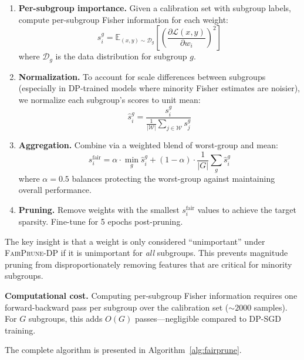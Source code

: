 \documentclass{article}
\newcommand{\FairPrunDP}{\textsc{FairPrune-DP}}
\begin{document}
\begin{enumerate}
    \item \textbf{Per-subgroup importance.} Given a calibration set with subgroup labels, compute per-subgroup Fisher information for each weight:
    \begin{equation}
        s_i^g = \mathbb{E}_{(x,y) \sim \mathcal{D}_g} \left[ \left(\frac{\partial \mathcal{L}(x, y)}{\partial w_i}\right)^2 \right]
        \label{eq:fisher}
    \end{equation}
    where $\mathcal{D}_g$ is the data distribution for subgroup $g$.

    \item \textbf{Normalization.} To account for scale differences between subgroups (especially in DP-trained models where minority Fisher estimates are noisier), we normalize each subgroup's scores to unit mean:
    \begin{equation}
        \hat{s}_i^g = \frac{s_i^g}{\frac{1}{|\mathcal{W}|}\sum_{j \in \mathcal{W}} s_j^g}
    \end{equation}

    \item \textbf{Aggregation.} Combine via a weighted blend of worst-group and mean:
    \begin{equation}
        s_i^{\text{fair}} = \alpha \cdot \min_g \hat{s}_i^g + (1 - \alpha) \cdot \frac{1}{|G|}\sum_g \hat{s}_i^g
        \label{eq:fair_score}
    \end{equation}
    where $\alpha = 0.5$ balances protecting the worst-group against maintaining overall performance.

    \item \textbf{Pruning.} Remove weights with the smallest $s_i^{\text{fair}}$ values to achieve the target sparsity. Fine-tune for 5 epochs post-pruning.
\end{enumerate}

The key insight is that a weight is only considered ``unimportant'' under \FairPrunDP{} if it is unimportant for \emph{all} subgroups. This prevents magnitude pruning from disproportionately removing features that are critical for minority subgroups.

\textbf{Computational cost.} Computing per-subgroup Fisher information requires one forward-backward pass per subgroup over the calibration set (${\sim}2000$ samples). For $G$ subgroups, this adds $O(G)$ passes---negligible compared to DP-SGD training.

The complete algorithm is presented in Algorithm~\ref{alg:fairprune}.
\end{document}
